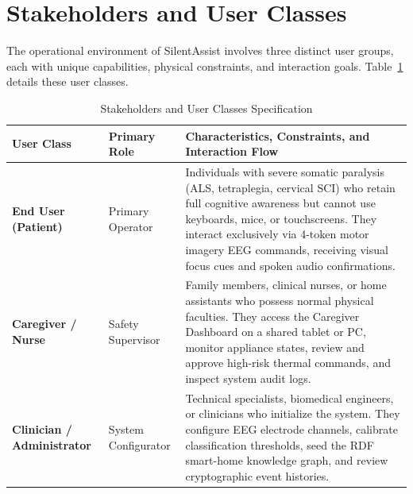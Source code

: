\documentclass[12pt,a4paper]{report}
\begin{document}
\section{Stakeholders and User Classes}
The operational environment of SilentAssist involves three distinct user groups, each with unique capabilities, physical constraints, and interaction goals. Table~\ref{tab:stakeholders} details these user classes.

\begin{table}[H]
\centering
\small
\caption{Stakeholders and User Classes Specification}
\label{tab:stakeholders}
\begin{tabularx}{\textwidth}{p{3.2cm} p{2.4cm} X}
\toprule
\textbf{User Class} & \textbf{Primary Role} & \textbf{Characteristics, Constraints, and Interaction Flow} \\
\midrule
\textbf{End User (Patient)} & Primary Operator & Individuals with severe somatic paralysis (ALS, tetraplegia, cervical SCI) who retain full cognitive awareness but cannot use keyboards, mice, or touchscreens. They interact exclusively via 4-token motor imagery EEG commands, receiving visual focus cues and spoken audio confirmations. \\
\addlinespace
\textbf{Caregiver / Nurse} & Safety Supervisor & Family members, clinical nurses, or home assistants who possess normal physical faculties. They access the Caregiver Dashboard on a shared tablet or PC, monitor appliance states, review and approve high-risk thermal commands, and inspect system audit logs. \\
\addlinespace
\textbf{Clinician / Administrator} & System Configurator & Technical specialists, biomedical engineers, or clinicians who initialize the system. They configure EEG electrode channels, calibrate classification thresholds, seed the RDF smart-home knowledge graph, and review cryptographic event histories. \\
\bottomrule
\end{tabularx}
\end{table}
\end{document}
